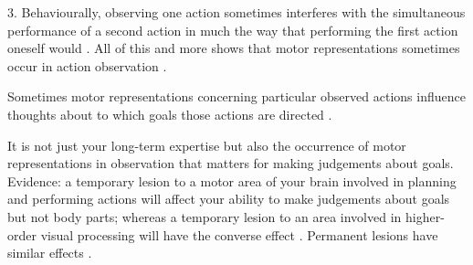 \documentclass[12pt]{extarticle}
\begin{document}
\begin{multicols*}{3}
3. Behaviourally, observing one action sometimes interferes with the simultaneous performance of a second action in much the way that performing the first action oneself would \citep{kilner:2003_interference}.  
All of this and more shows that motor representations sometimes occur in action observation \citep[for reviews, see][]{rizzolatti_mirrors_2008,rizzolatti_functional_2010}.

Sometimes motor representations concerning particular observed actions influence thoughts about to which goals those actions are directed \citep{casile:2006_nonvisual,beets:2010_nonvisual}. 

It is not just your long-term expertise but also the occurrence of motor representations in observation that matters for making judgements about goals.
Evidence: a temporary lesion to a motor area of your brain involved in planning and performing actions will affect your ability to make judgements about goals but not body parts; whereas a temporary lesion to an area involved in higher-order visual processing will have the converse effect \citep[compare][]{urgesi:2007_representation}.  Permanent lesions have similar effects \citep{pazzaglia:2008_sound_}.





\footnotesize


\end{multicols*}
\end{document}
